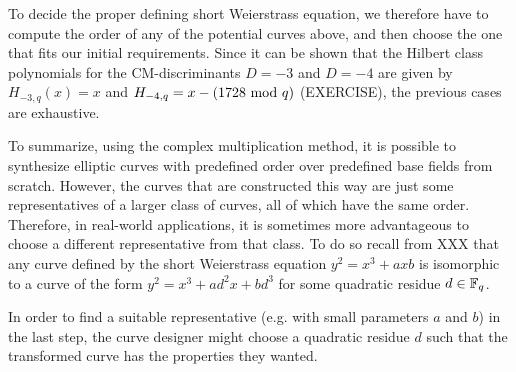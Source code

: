 To decide the proper defining short Weierstrass equation, we therefore have to compute the order of any of the potential curves above, and then choose the one that fits our initial requirements. Since it can be shown that the Hilbert class polynomials for the CM-discriminants $D=-3$ and $D=-4$ are given by  $H_{-3,q}(x)=x$ and $H_{-4,q}= x-(1728 \text{ mod } q)$ (EXERCISE), the previous cases are exhaustive.

To summarize, using the complex multiplication method, it is possible to synthesize elliptic curves with predefined order over predefined base fields from scratch. However, the curves that are constructed this way are just some representatives of a larger class of curves, all of which have the same order. Therefore, in real-world applications, it is sometimes more advantageous to choose a different representative from that class. To do so recall from XXX that any curve defined by the short Weierstrass equation $y^2 = x^3 + ax b$ is isomorphic to a curve of the form $y^2 = x^3 + ad^2 x + bd^3$ for some quadratic residue $d\in \mathbb{F}_q$. 

In order to find a suitable representative (e.g. with small parameters $a$ and $b$) in the last step, the curve designer might choose a quadratic residue $d$ such that the transformed curve has the properties they wanted.

